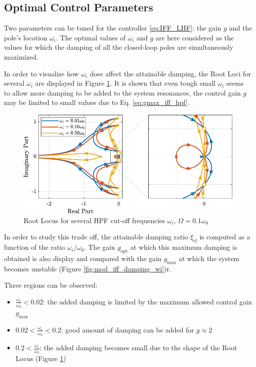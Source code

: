 \documentclass{ISMA_USD2020}
\begin{document}
\subsection{Optimal Control Parameters}
\label{sec:org77a266b}
Two parameters can be tuned for the controller \eqref{eq:IFF_LHF}: the gain \(g\) and the pole's location \(\omega_i\).
The optimal values of \(\omega_i\) and \(g\) are here considered as the values for which the damping of all the closed-loop poles are simultaneously maximized.

In order to visualize how \(\omega_i\) does affect the attainable damping, the Root Loci for several \(\omega_i\) are displayed in Figure \ref{fig:root_locus_wi_modified_iff}.
It is shown that even tough small \(\omega_i\) seems to allow more damping to be added to the system resonances, the control gain \(g\) may be limited to small values due to Eq. \eqref{eq:gmax_iff_hpf}.

\begin{figure}[htbp]
\centering
\includegraphics[scale=1]{figs/root_locus_wi_modified_iff.pdf}
\caption{\label{fig:root_locus_wi_modified_iff}Root Locus for several HPF cut-off frequencies \(\omega_i\), \(\Omega = 0.1 \omega_0\)}
\end{figure}

In order to study this trade off, the attainable damping ratio \(\xi_{\text{cl}}\) is computed as a function of the ratio \(\omega_i/\omega_0\).
The gain \(g_{\text{opt}}\) at which this maximum damping is obtained is also display and compared with the gain \(g_{\text{max}}\) at which the system becomes unstable (Figure \ref{fig:mod_iff_damping_wi})r.

Three regions can be observed:
\begin{itemize}
\item \(\frac{\omega_i}{\omega_0} < 0.02\): the added damping is limited by the maximum allowed control gain \(g_{\text{max}}\)
\item \(0.02 < \frac{\omega_i}{\omega_0} < 0.2\): good amount of damping can be added for \(g \approx 2\)
\item \(0.2 < \frac{\omega_i}{\omega_0}\): the added damping becomes small due to the shape of the Root Locus (Figure \ref{fig:root_locus_wi_modified_iff})
\end{itemize}
\end{document}
